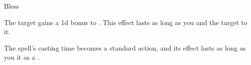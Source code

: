 \begin{spellsection}{Bless}
\begin{spellheader}
\end{spellheader}
\begin{spellcontent}
\begin{spelltargetinginfo}
\end{spelltargetinginfo}
\begin{spelleffects}
\spelleffect
The target gains a \plus1d bonus to .
This effect lasts as long as you and the target  to it.
\end{spelleffects}
\end{spellcontent}
\begin{spellfooter}
\end{spellfooter}
\begin{spellsubcontent}
\begin{spellcantrip}
The spell's casting time becomes a standard action, and its effect lasts as long as you  it as a .
\end{spellcantrip}
\end{spellsubcontent}
\end{spellsection}
